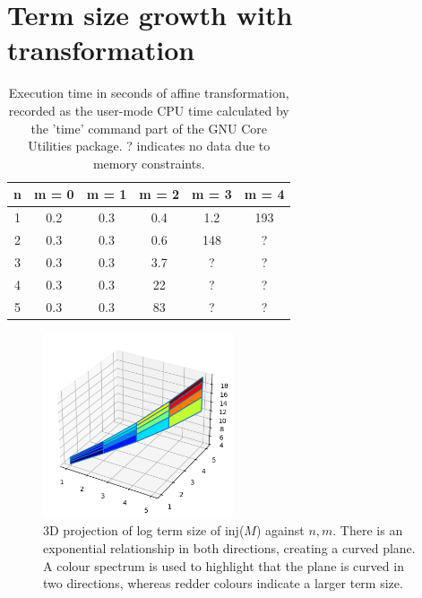 \documentclass[12pt,a4paper]{report}
\theoremstyle{definition}
\theoremstyle{definition}
\theoremstyle{remark}
\begin{document}

\chapter{Term size growth with transformation}\label{appendix:term-growth}

\begin{table}[!ht]
  \centering
  \caption{Execution time in seconds of affine transformation, recorded as the user-mode CPU time calculated by the 'time' command part of the GNU Core Utilities package. ? indicates no data due to memory constraints.}
  \label{tab:timings}
  \begin{tabular}{c c c c c c}
    \toprule
    \textbf{n} & \textbf{m = 0} & \textbf{m = 1} & \textbf{m = 2} & \textbf{m = 3} & \textbf{m = 4}\\
    \midrule
    1 & 0.2 & 0.3 & 0.4 & 1.2 & 193\\
    2 & 0.3 & 0.3 & 0.6 & 148 & ?\\
    3 & 0.3 & 0.3 & 3.7 & ? & ?\\
    4 & 0.3 & 0.3 & 22 & ? & ?\\
    5 & 0.3 & 0.3 & 83 & ? & ?\\
    \bottomrule
  \end{tabular}
\end{table}

\begin{figure}[!ht]
    \centering
    \includegraphics[width=0.5\textwidth]{media/inj_term_size_plane.png}
    \caption{3D projection of log term size of inj($M$) against $n,m$. There is an exponential relationship in both directions, creating a curved plane. A colour spectrum is used to highlight that the plane is curved in two directions, whereas redder colours indicate a larger term size.}
    \label{fig:3d-plane-term-size}
\end{figure}
\end{document}
